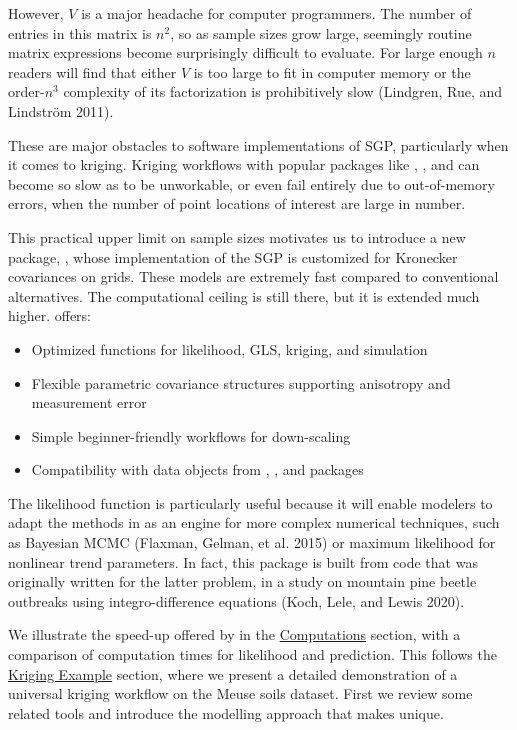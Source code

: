 However, \(V\) is a major headache for computer programmers. The number of entries in this matrix is \(n^2\), so as sample sizes grow large, seemingly routine matrix expressions become surprisingly difficult to evaluate. For large enough \(n\) readers will find that either \(V\) is too large to fit in computer memory or the order-\(n^3\) complexity of its factorization is prohibitively slow (Lindgren, Rue, and Lindström 2011).

These are major obstacles to software implementations of SGP, particularly when it comes to kriging. Kriging workflows with popular packages like , , and  can become so slow as to be unworkable, or even fail entirely due to out-of-memory errors, when the number of point locations of interest are large in number.

This practical upper limit on sample sizes motivates us to introduce a new package, , whose implementation of the SGP is customized for Kronecker covariances on grids. These models are extremely fast compared to conventional alternatives. The computational ceiling is still there, but it is extended much higher.  offers:

\begin{itemize}
\tightlist
\item
  Optimized functions for likelihood, GLS, kriging, and simulation
\item
  Flexible parametric covariance structures supporting anisotropy and measurement error
\item
  Simple beginner-friendly workflows for down-scaling
\item
  Compatibility with data objects from , , and  packages
\end{itemize}

The likelihood function is particularly useful because it will enable modelers to adapt the methods in  as an engine for more complex numerical techniques, such as Bayesian MCMC (Flaxman, Gelman, et al. 2015) or maximum likelihood for nonlinear trend parameters. In fact, this package is built from code that was originally written for the latter problem, in a study on mountain pine beetle outbreaks using integro-difference equations (Koch, Lele, and Lewis 2020).

We illustrate the speed-up offered by  in the \protect\hyperlink{computations}{Computations} section, with a comparison of computation times for likelihood and prediction. This follows the \protect\hyperlink{kriging-example}{Kriging Example} section, where we present a detailed demonstration of a universal kriging workflow on the Meuse soils dataset. First we review some related tools and introduce the modelling approach that makes  unique.

